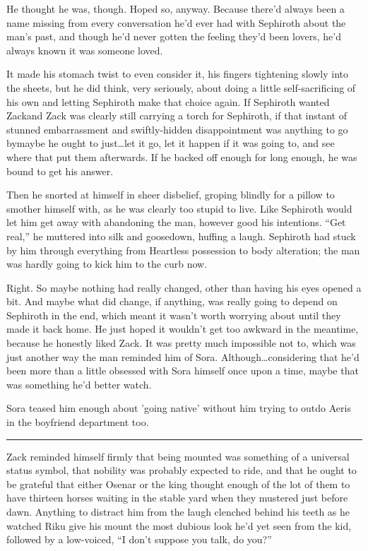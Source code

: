 He thought he was, though. Hoped so, anyway. Because there'd always been a name missing from every conversation he'd ever had with Sephiroth about the man's past, and though he'd never gotten the feeling they'd been lovers, he'd always known it was someone loved.

It made his stomach twist to even consider it, his fingers tightening slowly into the sheets, but he did think, very seriously, about doing a little self-sacrificing of his own and letting Sephiroth make that choice again. If Sephiroth wanted Zack\textemdash and Zack was clearly still carrying a torch for Sephiroth, if that instant of stunned embarrassment and swiftly-hidden disappointment was anything to go by\textemdash maybe he ought to just\ldots let it go, let it happen if it was going to, and see where that put them afterwards. If he backed off enough for long enough, he was bound to get his answer.

Then he snorted at himself in sheer disbelief, groping blindly for a pillow to smother himself with, as he was clearly too stupid to live. Like Sephiroth would let him get away with abandoning the man, however good his intentions. ``Get real,'' he muttered into silk and goosedown, huffing a laugh. Sephiroth had stuck by him through everything from Heartless possession to body alteration; the man was hardly going to kick him to the curb now.

Right. So maybe nothing had really changed, other than having his eyes opened a bit. And maybe what did change, if anything, was really going to depend on Sephiroth in the end, which meant it wasn't worth worrying about until they made it back home. He just hoped it wouldn't get too awkward in the meantime, because he honestly liked Zack. It was pretty much impossible not to, which was just another way the man reminded him of Sora. Although\ldots considering that he'd been more than a little obsessed with Sora himself once upon a time, maybe that was something he'd better watch.

Sora teased him enough about 'going native' without him trying to outdo Aeris in the boyfriend department too.

\fancybreak{\pfbreakdisplay}


Zack reminded himself firmly that being mounted was something of a universal status symbol, that nobility was probably expected to ride, and that he ought to be grateful that either Osenar or the king thought enough of the lot of them to have thirteen horses waiting in the stable yard when they mustered just before dawn. Anything to distract him from the laugh clenched behind his teeth as he watched Riku give his mount the most dubious look he'd yet seen from the kid, followed by a low-voiced, ``I don't suppose you talk, do you?''

